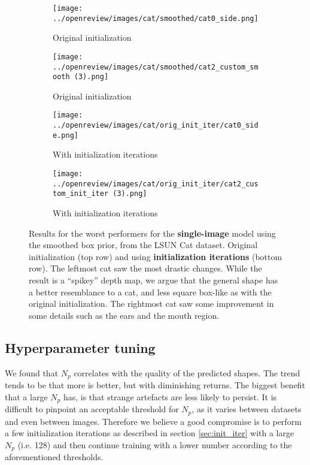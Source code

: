 \begin{figure}[!htb]
    \centering
    \begin{subfigure}{0.4\textwidth}
        \centering
        \texttt{[image: ../openreview/images/cat/smoothed/cat0\_side.png]}
        \caption{Original initialization}
    \end{subfigure}
    \begin{subfigure}{0.4\textwidth}
        \centering
        \texttt{[image: ../openreview/images/cat/smoothed/cat2\_custom\_smooth (3).png]}
        \caption{Original initialization}
    \end{subfigure}
    \begin{subfigure}{0.4\textwidth}
        \centering
        \texttt{[image: ../openreview/images/cat/orig\_init\_iter/cat0\_side.png]}
        \caption{With initialization iterations}
    \end{subfigure}
    \begin{subfigure}{0.4\textwidth}
        \centering
        \texttt{[image: ../openreview/images/cat/orig\_init\_iter/cat2\_custom\_init\_iter (3).png]}
        \caption{With initialization iterations}
    \end{subfigure}
    \caption{Results for the worst performers for the \textbf{single-image} model using the smoothed box prior, from the LSUN Cat dataset. Original initialization (top row) and using \textbf{initialization iterations} (bottom row). The leftmost cat saw the most drastic changes. While the result is a ``spikey'' depth map, we argue that the general shape has a better resemblance to a cat, and less square box-like as with the original initialization. The rightmost cat saw some improvement in some details such as the ears and the mouth region.}
    \label{fig:init_iter_single}
\end{figure}




\subsection{Hyperparameter tuning}
\label{app:hyperparams-tuning}
We found that $N_p$ correlates with the quality of the predicted shapes. The trend tends to be that more is better, but with diminishing returns. The biggest benefit that a large $N_p$ has, is that strange artefacts are less likely to persist. It is difficult to pinpoint an acceptable threshold for $N_p$, as it varies between datasets and even between images.  Therefore we believe a good compromise is to perform a few initialization iterations as described in section \ref{sec:init_iter} with a large $N_p$ (i.e. 128) and then continue training with a lower number according to the aforementioned thresholds.

